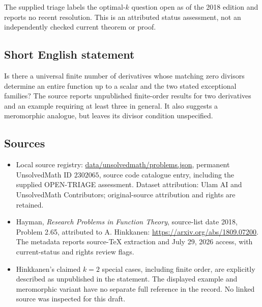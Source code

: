 \documentclass[11pt]{article}
\begin{document}
The supplied triage labels the optimal-$k$ question open as of the 2018 edition and reports no recent resolution. This is an attributed status assessment, not an independently checked current theorem or proof.
\subsection{Short English statement}
Is there a universal finite number of derivatives whose matching zero divisors determine an entire function up to a scalar and the two stated exceptional families? The source reports unpublished finite-order results for two derivatives and an example requiring at least three in general. It also suggests a meromorphic analogue, but leaves its divisor condition unspecified.
\subsection{Sources}
\begin{itemize}
\item Local source registry: \url{data/unsolvedmath/problems.json}, permanent UnsolvedMath ID $2302065$, source code catalogue entry, including the supplied OPEN-TRIAGE assessment. Dataset attribution: Ulam AI and UnsolvedMath Contributors; original-source attribution and rights are retained.
\item Hayman, \emph{Research Problems in Function Theory}, source-list date 2018, Problem 2.65, attributed to A. Hinkkanen: \url{https://arxiv.org/abs/1809.07200}. The metadata reports source-TeX extraction and July 29, 2026 access, with current-status and rights review flags.
\item Hinkkanen's claimed $k=2$ special cases, including finite order, are explicitly described as unpublished in the statement. The displayed example and meromorphic variant have no separate full reference in the record. No linked source was inspected for this draft.
\end{itemize}
\end{document}
